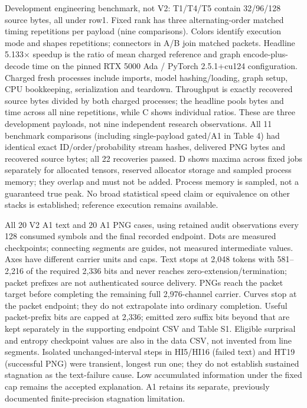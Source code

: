 \caption{Development engineering benchmark, not V2: T1/T4/T5 contain 32/96/128 source bytes, all under row1. Fixed rank has three alternating-order matched timing repetitions per payload (nine comparisons). Colors identify execution mode and shapes repetitions; connectors in A/B join matched packets. Headline 5.133$\times$ speedup is the ratio of mean charged reference and graph encode-plus-decode time on the pinned RTX 5000 Ada / PyTorch 2.5.1+cu124 configuration. Charged fresh processes include imports, model hashing/loading, graph setup, CPU bookkeeping, serialization and teardown. Throughput is exactly recovered source bytes divided by both charged processes; the headline pools bytes and time across all nine repetitions, while C shows individual ratios. These are three development payloads, not nine independent research observations. All 11 benchmark comparisons (including single-payload gated/A1 in Table 4) had identical exact ID/order/probability stream hashes, delivered PNG bytes and recovered source bytes; all 22 recoveries passed. D shows maxima across fixed jobs separately for allocated tensors, reserved allocator storage and sampled process memory; they overlap and must not be added. Process memory is sampled, not a guaranteed true peak. No broad statistical speed claim or equivalence on other stacks is established; reference execution remains available.}
\label{fig:figure4_gpu_performance}

\caption{All 20 V2 A1 text and 20 A1 PNG cases, using retained audit observations every 128 consumed symbols and the final recorded endpoint. Dots are measured checkpoints; connecting segments are guides, not measured intermediate values. Axes have different carrier units and caps. Text stops at 2,048 tokens with 581--2,216 of the required 2,336 bits and never reaches zero-extension/termination; packet prefixes are not authenticated source delivery. PNGs reach the packet target before completing the remaining full 2,976-channel carrier. Curves stop at the packet endpoint; they do not extrapolate into ordinary completion. Useful packet-prefix bits are capped at 2,336; emitted zero suffix bits beyond that are kept separately in the supporting endpoint CSV and Table S1. Eligible surprisal and entropy checkpoint values are also in the data CSV, not invented from line segments. Isolated unchanged-interval steps in HI5/HI16 (failed text) and HT19 (successful PNG) were transient, longest run one; they do not establish sustained stagnation as the text-failure cause. Low accumulated information under the fixed cap remains the accepted explanation. A1 retains its separate, previously documented finite-precision stagnation limitation.}
\label{fig:figureS1_arithmetic_capacity}

